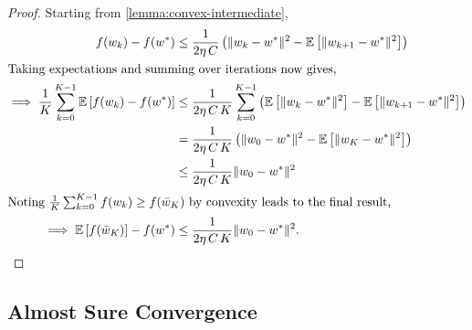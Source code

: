 \wgcConvexIndSmooth*

\begin{proof}
   Starting from \autoref{lemma:convex-intermediate},
   \begin{align*}
    f(w_k) - f(w^*) &\leq \frac{1}{2\eta \, C} \left(\|w_k - w^*\|^2 - \mathbb{E} \left[\|w_{k+1} - w^*\|^2\right]\right)\\
\intertext{Taking expectations and summing over iterations now gives,}
    \implies \frac{1}{K} \sum_{k=0}^{K -1} \mathbb{E} \left[f(w_k) - f(w^*)\right] &\leq \frac{1}{2\eta \, C \, K}\sum_{k=0}^{K-1}\left(\mathbb{E}\left[\|w_k - w^*\|^2\right] - \mathbb{E}\left[\|w_{k+1} - w^*\|^2\right]\right)\\
                                                         &= \frac{1}{2\eta \, C \, K}\left(\|w_0 - w^*\|^2 - \mathbb{E}\left[\|w_{K} - w^*\|^2\right]\right)\\
                                                         &\leq \frac{1}{2\eta \, C \, K} \|w_0 - w^*\|^2\\
\intertext{Noting \( \frac{1}{K}\sum_{k=0}^{K-1} f(w_k) \geq f(\bar {w}_K) \) by convexity leads to the final result,}
   \implies \mathbb{E}\left[f(\bar w_K)\right] - f(w^*) &\leq \frac{1}{2\eta \, C \, K}\|w_0 - w^*\|^2.
\end{align*}
\end{proof}


\subsection{Almost Sure Convergence}~\label{app:almost-sure-convergece}

